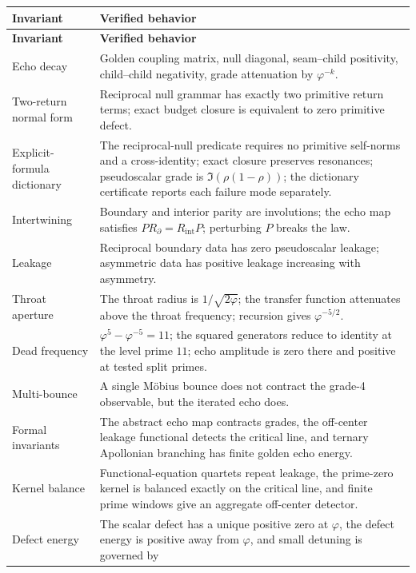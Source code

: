 \documentclass[11pt,a4paper]{article}
\theoremstyle{plain}
\theoremstyle{definition}
\theoremstyle{remark}
\numberwithin{equation}{section}
\newcommand{\vp}{\varphi}
\begin{document}
\begingroup
\small
\renewcommand{\arraystretch}{1.2}
\begin{longtable}{>{\raggedright\arraybackslash}p{3.1cm}>{\raggedright\arraybackslash}p{9.1cm}}
\toprule
\textbf{Invariant} & \textbf{Verified behavior} \\
\midrule
\endfirsthead
\toprule
\textbf{Invariant} & \textbf{Verified behavior} \\
\midrule
\endhead
Echo decay &
Golden coupling matrix, null diagonal, seam--child positivity,
child--child negativity, grade attenuation by \(\vp^{-k}\). \\
Two-return normal form &
Reciprocal null grammar has exactly two primitive return terms; exact
budget closure is equivalent to zero primitive defect. \\
Explicit-formula dictionary &
The reciprocal-null predicate requires no primitive self-norms and a
cross-identity; exact closure preserves resonances; pseudoscalar grade is
\(\Im(\rho(1-\rho))\); the dictionary certificate reports each failure
mode separately. \\
Intertwining &
Boundary and interior parity are involutions; the echo map satisfies
\(P R_\partial=R_{\mathrm{int}}P\); perturbing \(P\) breaks the law. \\
Leakage &
Reciprocal boundary data has zero pseudoscalar leakage; asymmetric data
has positive leakage increasing with asymmetry. \\
Throat aperture &
The throat radius is \(1/\sqrt{2\vp}\); the transfer function attenuates
above the throat frequency; recursion gives \(\vp^{-5/2}\). \\
Dead frequency &
\(\vp^5-\vp^{-5}=11\); the squared generators reduce to identity at
the level prime \(11\); echo amplitude is zero there and positive at
tested split primes. \\
Multi-bounce &
A single M\"obius bounce does not contract the grade-4 observable, but
the iterated echo does. \\
Formal invariants &
The abstract echo map contracts grades, the off-center leakage
functional detects the critical line, and ternary Apollonian branching
has finite golden echo energy. \\
Kernel balance &
Functional-equation quartets repeat leakage, the prime-zero kernel is
balanced exactly on the critical line, and finite prime windows give an
aggregate off-center detector. \\
Defect energy &
The scalar defect has a unique positive zero at \(\vp\), the defect
energy is positive away from \(\vp\), and small detuning is governed by

\end{longtable}
\end{document}
